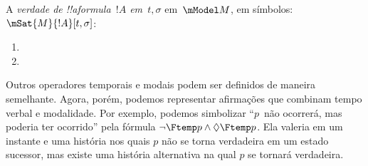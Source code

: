 \documentclass[../../../include/open-logic-section]{subfiles}
\begin{document}
\begin{defn}
  A \emph{verdade de !!a{formula}~$!A$ em~$t, \sigma$} em~$\mModel M$, em símbolos:
  $\mSat{M}{!A}[t, \sigma]$:
  \begin{enumerate}
  \item{} 
  \item{} 
  \end{enumerate} 
\end{defn}

Outros operadores temporais e modais podem ser definidos de maneira
semelhante. Agora, porém, podemos representar afirmações que combinam
tempo verbal e modalidade. Por exemplo, podemos simbolizar
``$p$~não ocorrerá, mas poderia ter ocorrido'' pela fórmula
$\lnot \Ftemp p \land \Diamond \Ftemp p$. Ela valeria em um instante e
uma história nos quais $p$ não se torna verdadeira em um estado
sucessor, mas existe uma história alternativa na qual $p$ se tornará
verdadeira. 
\end{document}
